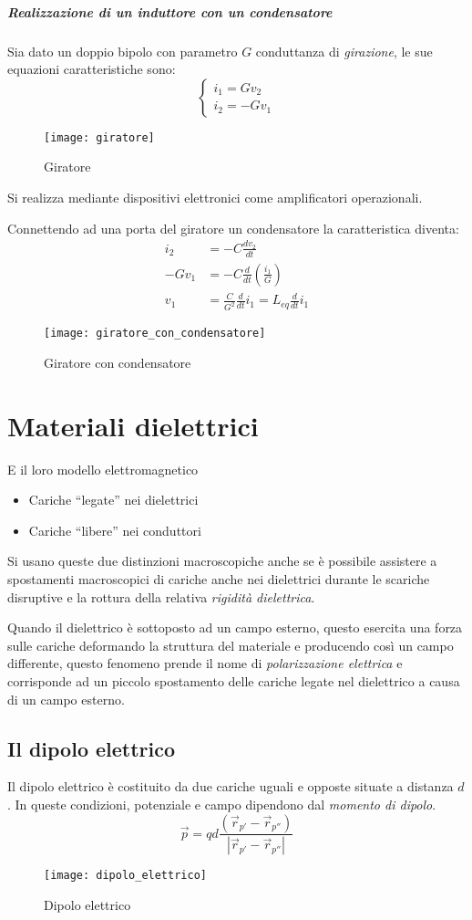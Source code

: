 \subparagraph{Realizzazione di un induttore con un condensatore}
Sia dato un doppio bipolo con parametro $G$ conduttanza di
\textit{girazione}, le sue equazioni caratteristiche sono:
$$
\begin{cases}
i_1 = G v_2\\
i_2 = -G v_1
\end{cases}
$$
\begin{figure}[h!]
\centering
\texttt{[image: giratore]}
\caption{Giratore}
\end{figure}
Si realizza mediante dispositivi elettronici come 
amplificatori operazionali.

Connettendo ad una porta del giratore un condensatore la 
caratteristica diventa:
$$
\begin{aligned}
i_2 &= -C \frac{dv_2}{dt}\\
-Gv_1 &= -C\frac{d}{dt}\left(\frac{i_1}{G}\right)\\
v_1 &= \frac{C}{G^2}\frac{d}{dt}i_1 = L_{eq} \frac{d}{dt}i_1
\end{aligned}
$$
\begin{figure}[h!]
\centering
\texttt{[image: giratore\_con\_condensatore]}
\caption{Giratore con condensatore}
\end{figure}

\section{Materiali dielettrici}
E il loro modello elettromagnetico

\begin{itemize}
 \item Cariche ``legate'' nei dielettrici
 \item Cariche ``libere'' nei conduttori
\end{itemize}
Si usano queste due distinzioni macroscopiche anche se è possibile
assistere a spostamenti macroscopici di cariche anche nei dielettrici
durante le scariche disruptive e la rottura della relativa 
\textit{rigidità dielettrica}.

Quando il dielettrico è sottoposto ad un campo esterno, questo esercita 
una forza sulle cariche deformando la struttura del materiale e 
producendo così un campo differente, questo fenomeno prende il nome
di \textit{polarizzazione elettrica} e corrisponde ad un piccolo
spostamento delle cariche legate nel dielettrico a causa di un campo
esterno.
\subsection{Il dipolo elettrico}
Il dipolo elettrico è costituito da due cariche uguali e opposte
situate a distanza $d$. In queste condizioni, potenziale e campo 
dipendono dal \textit{momento di dipolo}.
$$
\vec{p} = qd \frac{(\vec{r}_{p'}-\vec{r}_{p''})}{|\vec{r}_{p'}-\vec{r}_{p''}|}
$$
\begin{figure}[h!]
\centering
\texttt{[image: dipolo\_elettrico]}
\caption{Dipolo elettrico}
\end{figure}

